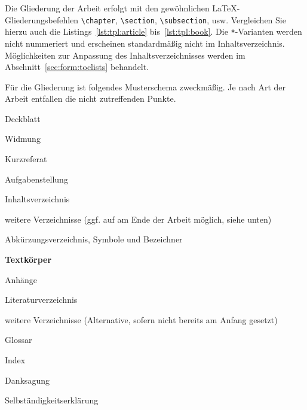 Die Gliederung der Arbeit erfolgt mit den gewöhnlichen
\LaTeX-Gliederungsbefehlen \verb+\chapter+, \verb+\section+,
\verb+\subsection+, usw. Vergleichen Sie hierzu auch die
Listings~\ref{lst:tpl:article} bis~\ref{lst:tpl:book}. Die \texttt{*}-Varianten
werden nicht nummeriert und erscheinen standardmäßig nicht im
Inhaltsverzeichnis. Möglichkeiten zur Anpassung des Inhaltsverzeichnisses
werden im Abschnitt~\ref{sec:form:toclists} behandelt.

Für die Gliederung ist folgendes Musterschema zweckmäßig. Je nach Art der
Arbeit entfallen die nicht zutreffenden Punkte.

\begin{compactitem}
\item Deckblatt
\item Widmung
\item Kurzreferat
\item Aufgabenstellung
\item Inhaltsverzeichnis
\item weitere Verzeichnisse
      (ggf. auf am Ende der Arbeit möglich, siehe unten)
\item Abkürzungsverzeichnis, Symbole und Bezeichner
\item \textbf{Textkörper}
\item Anhänge
\item Literaturverzeichnis
\item weitere Verzeichnisse
      (Alternative, sofern nicht bereits am Anfang gesetzt)
\item Glossar
\item Index
\item Danksagung
\item Selbständigkeitserklärung
\end{compactitem}
